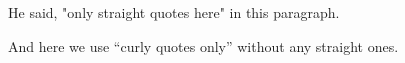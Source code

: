 He said, "only straight quotes here" in this paragraph.

And here we use “curly quotes only” without any straight ones.

